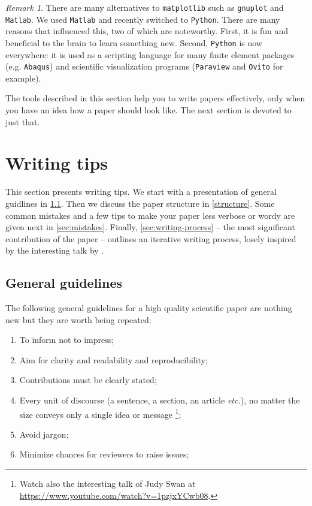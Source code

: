 \documentclass[authoryear,3p,times,preprint,review,fleqn]{elsarticle}
\makeatletter
\newcommand{\etc}{\textit{etc.}\@\xspace}
\numberwithin{equation}{section}
\theoremstyle{remark}
\newtheorem{rmk}{Remark}
\makeatother
\begin{document}
\begin{rmk}\label{rm:a}
There are many alternatives to \texttt{matplotlib} such as \texttt{gnuplot} and \texttt{Matlab}. We used  \texttt{Matlab} and recently switched to \texttt{Python}. There are many reasons that influenced this, two of which are noteworthy. First, it is fun and beneficial to the brain to learn something new. Second, \texttt{Python} is now everywhere: it is used as a scripting language for many finite element packages (e.g. \texttt{Abaqus}) and scientific visualization programs (\texttt{Paraview} and \texttt{Ovito} for example).
\end{rmk}


The tools described in this section help you to write papers effectively, only when you have an idea how a paper should look like. The next section is devoted to just that. 

\section{Writing tips}\label{sec:writing-tips}

This section presents  writing tips. We start with a presentation of general guidlines in \cref{sec:guidelines}. Then we  discuss the paper structure in \cref{structure}. Some common mistakes and a few tips to make your paper less verbose or wordy are given next in 
\cref{sec:mistakes}. Finally, \cref{sec:writing-process} -- the most significant contribution of the paper -- outlines an iterative writing process, losely inspired by the interesting talk by \cite{Jones}.

\subsection{General guidelines}\label{sec:guidelines}

The following general guidelines for a high quality scientific paper are nothing new but they are worth being repeated:

\begin{enumerate}
\item To inform not to impress;
\item Aim for clarity and readability and  reproducibility;
\item Contributions must be clearly stated;
\item Every unit of discourse (a sentence, a section, an article \etc), no matter the size conveys only a single idea or message \citep{gopen1990science}\footnote{Watch also the interesting talk of Judy Swan at \url{https://www.youtube.com/watch?v=1pzjxYCwb08}.};
\item Avoid jargon;%
\item Minimize chances for reviewers to raise issues;
\end{enumerate}
\end{document}
